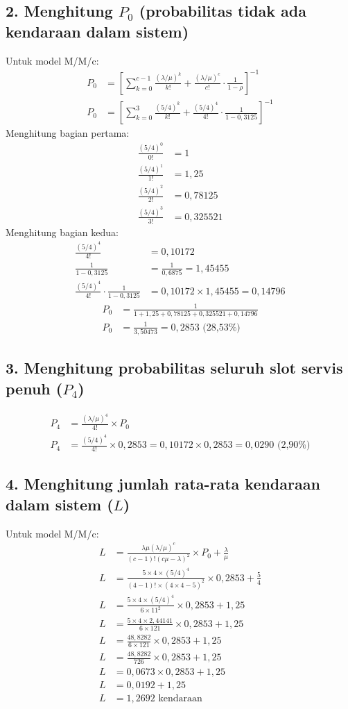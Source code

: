 \documentclass{article}
\begin{document}
\subsection*{2. Menghitung $P_0$ (probabilitas tidak ada kendaraan dalam sistem)}
Untuk model M/M/c:
\begin{align}
P_0 &= \left[ \sum_{k=0}^{c-1}\frac{(\lambda/\mu)^k}{k!} + \frac{(\lambda/\mu)^c}{c!} \cdot \frac{1}{1-\rho} \right]^{-1} \\
P_0 &= \left[ \sum_{k=0}^{3}\frac{(5/4)^k}{k!} + \frac{(5/4)^4}{4!} \cdot \frac{1}{1-0,3125} \right]^{-1}
\end{align}
Menghitung bagian pertama:
\begin{align}
\frac{(5/4)^0}{0!} &= 1 \\
\frac{(5/4)^1}{1!} &= 1,25 \\
\frac{(5/4)^2}{2!} &= 0,78125 \\
\frac{(5/4)^3}{3!} &= 0,325521
\end{align}
Menghitung bagian kedua:
\begin{align}
\frac{(5/4)^4}{4!} &= 0,10172 \\
\frac{1}{1-0,3125} &= \frac{1}{0,6875} = 1,45455 \\
\frac{(5/4)^4}{4!} \cdot \frac{1}{1-0,3125} &= 0,10172 \times 1,45455 = 0,14796
\end{align}
\begin{align}
P_0 &= \frac{1}{1 + 1,25 + 0,78125 + 0,325521 + 0,14796} \\
P_0 &= \frac{1}{3,50473} = 0,2853 \text{ (28,53\%)}
\end{align}
\subsection*{3. Menghitung probabilitas seluruh slot servis penuh ($P_4$)}
\begin{align}
P_4 &= \frac{(\lambda/\mu)^4}{4!} \times P_0 \\
P_4 &= \frac{(5/4)^4}{4!} \times 0,2853 = 0,10172 \times 0,2853 = 0,0290 \text{ (2,90\%)}
\end{align}
\subsection*{4. Menghitung jumlah rata-rata kendaraan dalam sistem ($L$)}
Untuk model M/M/c:
\begin{align}
L &= \frac{\lambda\mu(\lambda/\mu)^c}{(c-1)!(c\mu-\lambda)^2} \times P_0 + \frac{\lambda}{\mu} \\
L &= \frac{5 \times 4 \times (5/4)^4}{(4-1)! \times (4 \times 4 - 5)^2} \times 0,2853 + \frac{5}{4} \\
L &= \frac{5 \times 4 \times (5/4)^4}{6 \times 11^2} \times 0,2853 + 1,25 \\
L &= \frac{5 \times 4 \times 2,44141}{6 \times 121} \times 0,2853 + 1,25 \\
L &= \frac{48,8282}{6 \times 121} \times 0,2853 + 1,25 \\
L &= \frac{48,8282}{726} \times 0,2853 + 1,25 \\
L &= 0,0673 \times 0,2853 + 1,25 \\
L &= 0,0192 + 1,25 \\
L &= 1,2692 \text{ kendaraan}
\end{align}
\end{document}
